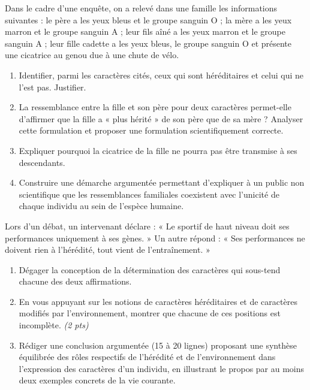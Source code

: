 \documentclass[11pt]{article}
\begin{document}
\begin{exercice}
Dans le cadre d'une enquête, on a relevé dans une famille les informations suivantes : le père a les yeux bleus et le groupe sanguin O ; la mère a les yeux marron et le groupe sanguin A ; leur fils aîné a les yeux marron et le groupe sanguin A ; leur fille cadette a les yeux bleus, le groupe sanguin O et présente une cicatrice au genou due à une chute de vélo.
\begin{enumerate}
\item Identifier, parmi les caractères cités, ceux qui sont héréditaires et celui qui ne l'est pas. Justifier.
\item La ressemblance entre la fille et son père pour deux caractères permet-elle d'affirmer que la fille a « plus hérité » de son père que de sa mère ? Analyser cette formulation et proposer une formulation scientifiquement correcte.
\item Expliquer pourquoi la cicatrice de la fille ne pourra pas être transmise à ses descendants.
\item Construire une démarche argumentée permettant d'expliquer à un public non scientifique que les ressemblances familiales coexistent avec l'unicité de chaque individu au sein de l'espèce humaine.
\end{enumerate}
\end{exercice}

\begin{exercice}
Lors d'un débat, un intervenant déclare : « Le sportif de haut niveau doit ses performances uniquement à ses gènes. » Un autre répond : « Ses performances ne doivent rien à l'hérédité, tout vient de l'entraînement. »
\begin{enumerate}
\item Dégager la conception de la détermination des caractères qui sous-tend chacune des deux affirmations.
\item En vous appuyant sur les notions de caractères héréditaires et de caractères modifiés par l'environnement, montrer que chacune de ces positions est incomplète. \textit{(2 pts)}
\item Rédiger une conclusion argumentée (15 à 20 lignes) proposant une synthèse équilibrée des rôles respectifs de l'hérédité et de l'environnement dans l'expression des caractères d'un individu, en illustrant le propos par au moins deux exemples concrets de la vie courante.
\end{enumerate}
\end{exercice}
\end{document}
